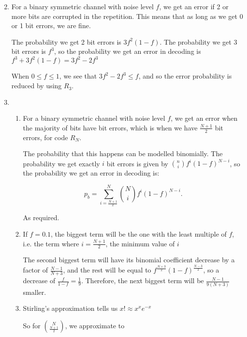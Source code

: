 


\begin{enumerate}[label=1.\arabic*]
  \setcounter{enumi}{1}
  \item

    For a binary symmetric channel with noise level $f$, we get an error if 2 or more bits are corrupted in the repetition. This means that as long as we get 0 or 1 bit errors, we are fine.

    The probability we get 2 bit errors is $3f^2(1-f)$. The probability we get 3 bit errors is $f^3$, so the probability we get an error in decoding is $f^3 + 3f^2(1-f) = 3f^2 - 2f^3$

    When $0 \leq f \leq 1$, we see that $3f^2 - 2f^3 \leq f$, and so the error probability is reduced by using $R_3$.

  \item
    \begin{enumerate}
        \item

          For a binary symmetric channel with noise level $f$, we get an error when the majority of bits have bit errors, which is when we have $\frac{N+1}{2}$ bit errors, for code $R_N$.

          The probability that this happens can be modelled binomially. The probability we get exactly $i$ bit errors is given by $\binom{n}{i} f^i (1-f)^{N-i}$, so the probability we get an error in decoding is:

          \[
            p_b = \sum_{i= \frac{N+1}{2}}^N \binom{N}{i} f^i (1-f)^{N-i}
          .\] 

          As required.

        \item
          If $f=0.1$, the biggest term will be the one with the least multiple of $f$, i.e. the term where $i = \frac{N+1}{2}$, the minimum value of $i$

          The second biggest term will have its binomial coefficient decrease by a factor of $\frac{N-1}{N+3}$, and the rest will be equal to $f^{\frac{N+3}{2}}(1-f)^{\frac{N-3}{2}}$, so a decrease of $\frac{f}{1-f} = \frac{1}{9}$. Therefore, the next biggest term will be $\frac{N-1}{9(N+3)}$ smaller.

        \item
          Stirling's approximation tells us $x! \approx x^xe^{-x}$

          So for $\binom{N}{\frac{N+1}{2}}$, we approximate to 


\end{enumerate}
\end{enumerate}
